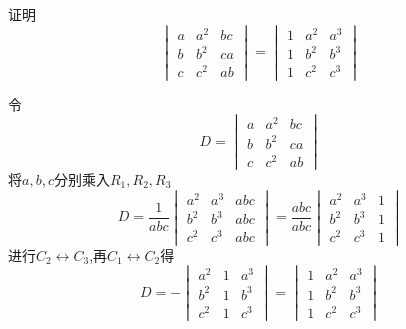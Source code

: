 \begin{questions}
    \question 证明
    \[
    \begin{vmatrix} 
    a & a^2 & bc \\ 
    b & b^2 & ca \\ 
    c & c^2 & ab 
    \end{vmatrix} 
    = 
    \begin{vmatrix} 
    1 & a^2 & a^3 \\ 
    1 & b^2 & b^3 \\ 
    1 & c^2 & c^3 
    \end{vmatrix}
    \]
    \begin{solution}
        令
        \[
        D=
        \begin{vmatrix} 
        a & a^2 & bc \\ 
        b & b^2 & ca \\ 
        c & c^2 & ab 
        \end{vmatrix} 
        \]
        将$a,b,c$分别乘入$R_1,R_2,R_3$
        \[
        D= \frac{1}{abc} 
        \begin{vmatrix} 
        a^2 & a^3 & abc \\ 
        b^2 & b^3 & abc \\ 
        c^2 & c^3 & abc 
        \end{vmatrix} 
        = \frac{abc}{abc} 
        \begin{vmatrix} 
        a^2 & a^3 & 1 \\ 
        b^2 & b^3 & 1 \\ 
        c^2 & c^3 & 1 
        \end{vmatrix} 
        \]
        进行$C_2 \leftrightarrow C_3$,再$C_1 \leftrightarrow C_2$得
        \[
        D= - 
        \begin{vmatrix} 
        a^2 & 1 & a^3 \\ 
        b^2 & 1 & b^3 \\ 
        c^2 & 1 & c^3 
        \end{vmatrix} 
        = 
        \begin{vmatrix} 
        1 & a^2 & a^3 \\ 
        1 & b^2 & b^3 \\ 
        1 & c^2 & c^3 
        \end{vmatrix}
        \]
    \end{solution}


\end{questions}
